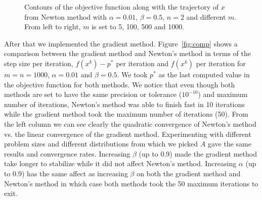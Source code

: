 \documentclass[12pt] {article}
\begin{document}
\begin{figure}[!tbh]
\centering        
   \caption{Contours of the objective function along with the trajectory of $x$ from Newton method with $\alpha = 0.01$, $\beta = 0.5$, $n=2$ and different $m$. From left to right, $m$ is set to 5, 100, 500 and 1000.}
   \label{fig:contours}
\end{figure}

After that we implemented the gradient method. Figure~\ref{fig:comp} shows a comparison between the gradient method and Newton's method in terms of the step size per iteration, $f(x^{k})-p^{*}$ per iteration and $f(x^{k})$ per iteration for $m=n=1000$, $\alpha = 0.01$ and $\beta = 0.5$. We took $p^{*}$ as the last computed value in the objective function for both methods. We notice that even though both methods are set to have the same precision or tolerance ($10^{-10}$) and maximum number of iterations, Newton's method was able to finish fast in 10 iterations while the gradient method took the maximum number of iterations (50). From the left column we can see clearly the quadratic convergence of Newton's method vs. the linear convergence of the gradient method. Experimenting with different problem sizes and different distributions from which we picked $A$ gave the same results and convergence rates. Increasing $\beta$ (up to 0.9) made the gradient method take longer to stabilize while it did not affect Newton's method. Increasing $\alpha$ (up to 0.9) has the same affect as increasing $\beta$ on both the gradient method and Newton's method in which case both methods took the 50 maximum iterations to exit.
\end{document}
